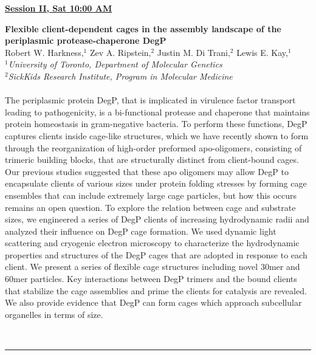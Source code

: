 \documentclass[titlepage,oneside,openany,10pt]{book}
\newenvironment{oralabs}[4] %
        {
        \begin{flushright}
                \underline{\textbf{#4}}
        \end{flushright}
        \textbf{#1}\\%
        #2\\%
        \textit{#3}\\\\%
        }
        {
        \\
        \noindent\rule{15cm}{0.5pt}%
        }
\begin{document}
\begin{oralabs}
    {Flexible client-dependent cages in the assembly landscape of the periplasmic protease-chaperone DegP}
    {Robert W. Harkness,$^{1}$ Zev A. Ripstein,$^{2}$ Justin M. Di Trani,$^{2}$ Lewis E. Kay,$^{1}$}
    {
    $^1$University of Toronto, Department of Molecular Genetics\\
    $^2$SickKids Research Institute, Program in Molecular Medicine
    }
    {Session II, Sat 10:00 AM}
    The periplasmic protein DegP, that is implicated in virulence factor transport leading to pathogenicity, is a bi-functional protease and chaperone that maintains protein homeostasis in gram-negative bacteria. To perform these functions, DegP captures clients inside cage-like structures, which we have recently shown to form through the reorganization of high-order preformed apo-oligomers, consisting of trimeric building blocks, that are structurally distinct from client-bound cages. Our previous studies suggested that these apo oligomers may allow DegP to encapsulate clients of various sizes under protein folding stresses by forming cage ensembles that can include extremely large cage particles, but how this occurs remains an open question. To explore the relation between cage and substrate sizes, we engineered a series of DegP clients of increasing hydrodynamic radii and analyzed their influence on DegP cage formation. We used dynamic light scattering and cryogenic electron microscopy to characterize the hydrodynamic properties and structures of the DegP cages that are adopted in response to each client. We present a series of flexible cage structures including novel 30mer and 60mer particles. Key interactions between DegP trimers and the bound clients that stabilize the cage assemblies and prime the clients for catalysis are revealed. We also provide evidence that DegP can form cages which approach subcellular organelles in terms of size.
    \label{HarknessR}
\end{oralabs}

\newpage
\end{document}
